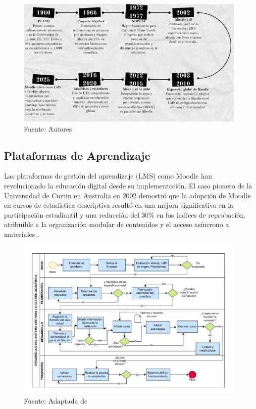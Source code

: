 \documentclass[letter,oneside,12pt,spanish]{report}
\begin{document}
\begin{figure}[ht]
	\centering
	\includegraphics[width=1\textwidth]{Figs/Linea del Tiempo.pdf}
	\label{fig:LineaTiempo}
	\\Fuente: Autores
\end{figure}

\subsection{Plataformas de Aprendizaje}
Las plataformas de gestión del aprendizaje (LMS) como Moodle han revolucionado la educación digital desde su implementación. El caso pionero de la Universidad de Curtin en Australia en 2002 demostró que la adopción de Moodle en cursos de estadística descriptiva resultó en una mejora significativa en la participación estudiantil y una reducción del 30\% en los índices de reprobación, atribuible a la organización modular de contenidos y el acceso asíncrono a materiales \parencite{Pacheco2025}.
\begin{figure}[ht]
    \centering
    \includegraphics[width=1\textwidth]{Figs/LMS.pdf}
    \label{fig:LMS}
    \\Fuente: Adaptada de \textcite{Pacheco2025}
\end{figure}
\end{document}
